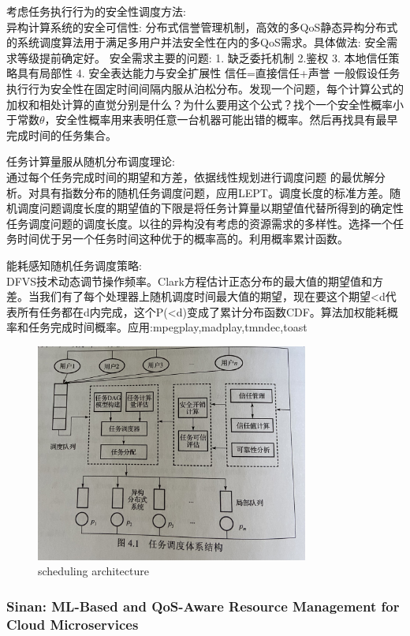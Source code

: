\documentclass[UTF8]{article}
\begin{document}
考虑任务执行行为的安全性调度方法:\\异构计算系统的安全可信性: 分布式信誉管理机制，高效的多QoS静态异构分布式的系统调度算法用于满足多用户并法安全性在内的多QoS需求。具体做法:  安全需求等级提前确定好。 安全需求主要的问题: 1. 缺乏委托机制 2.鉴权 3. 本地信任策略具有局部性 4. 安全表达能力与安全扩展性 信任=直接信任+声誉 一般假设任务执行行为安全性在固定时间间隔内服从泊松分布。发现一个问题，每个计算公式的加权和相处计算的直觉分别是什么？为什么要用这个公式？找个一个安全性概率小于常数$\theta$，安全性概率用来表明任意一台机器可能出错的概率。然后再找具有最早完成时间的任务集合。

任务计算量服从随机分布调度理论:\\ 通过每个任务完成时间的期望和方差，依据线性规划进行调度问题 的最优解分析。对具有指数分布的随机任务调度问题，应用LEPT。调度长度的标准方差。随机调度问题调度长度的期望值的下限是将任务计算量以期望值代替所得到的确定性任务调度问题的调度长度。以往的异构没有考虑的资源需求的多样性。选择一个任务时间优于另一个任务时间这种优于的概率高的。利用概率累计函数。

能耗感知随机任务调度策略:\\DFVS技术动态调节操作频率。Clark方程估计正态分布的最大值的期望值和方差。当我们有了每个处理器上随机调度时间最大值的期望，现在要这个期望<d代表所有任务都在d内完成，这个P(<d)变成了累计分布函数CDF。算法加权能耗概率和任务完成时间概率。应用:mpegplay,madplay,tmndec,toast

\begin{figure}[htbp]
\caption{scheduling architecture}
\centering
\includegraphics[width=0.8\textwidth]{xiaoyongSchedule.jpg}
\end{figure}
\subsubsection{Sinan: ML-Based and QoS-Aware Resource Management for Cloud Microservices}
\end{document}

